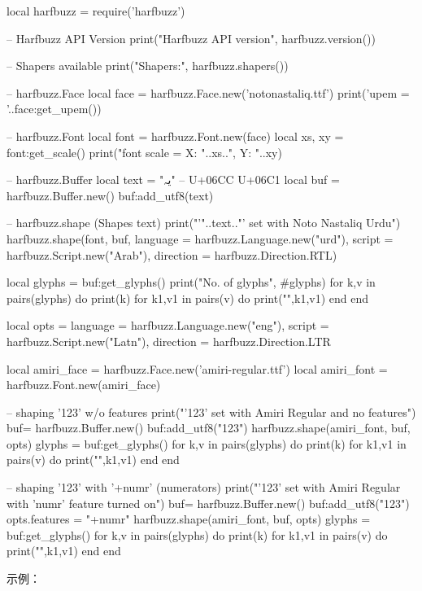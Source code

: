\begin{typing}
local harfbuzz = require('harfbuzz')

-- Harfbuzz API Version
print("Harfbuzz API version", harfbuzz.version())

-- Shapers available
print("Shapers:", harfbuzz.shapers())

-- harfbuzz.Face
local face = harfbuzz.Face.new('notonastaliq.ttf')
print('\nFace upem = '..face:get_upem())

-- harfbuzz.Font
local font = harfbuzz.Font.new(face)
local xs, xy = font:get_scale()
print("\nDefault font scale = X: "..xs..", Y: "..xy)

-- harfbuzz.Buffer
local text = "یہ" -- U+06CC U+06C1
local buf = harfbuzz.Buffer.new()
buf:add_utf8(text)

-- harfbuzz.shape (Shapes text)
print("\nShaping '"..text.."' set with Noto Nastaliq Urdu")
harfbuzz.shape(font, buf, { language = harfbuzz.Language.new("urd"), 
script = harfbuzz.Script.new("Arab"), direction = harfbuzz.Direction.RTL})

local glyphs = buf:get_glyphs()
print("No. of glyphs", #glyphs)
for k,v in pairs(glyphs) do 
  print(k) 
  for k1,v1 in pairs(v) do 
   print("",k1,v1) 
  end 
end 

local opts = { language = harfbuzz.Language.new("eng"), 
script = harfbuzz.Script.new("Latn"), direction = harfbuzz.Direction.LTR }

local amiri_face = harfbuzz.Face.new('amiri-regular.ttf')
local amiri_font = harfbuzz.Font.new(amiri_face)

-- shaping '123' w/o features
print("\nShaping '123' set with Amiri Regular and no features")
buf= harfbuzz.Buffer.new()
buf:add_utf8("123")
harfbuzz.shape(amiri_font, buf, opts)
glyphs = buf:get_glyphs()
for k,v in pairs(glyphs) do 
  print(k) 
  for k1,v1 in pairs(v) do 
   print("",k1,v1) 
  end 
end 

-- shaping '123' with '+numr' (numerators)
print("\nShaping '123' set with Amiri Regular with 'numr' feature turned on")
buf= harfbuzz.Buffer.new()
buf:add_utf8("123")
opts.features = "+numr"
harfbuzz.shape(amiri_font, buf, opts)
glyphs = buf:get_glyphs()
for k,v in pairs(glyphs) do 
  print(k) 
  for k1,v1 in pairs(v) do 
   print("",k1,v1) 
  end 
end 
\end{typing}

示例：


